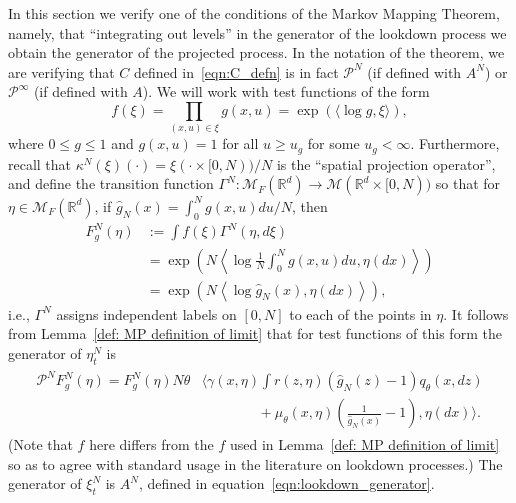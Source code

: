 \documentclass[EJP]{ejpecp} %
\renewcommand{\hat}{\widehat}
\newcommand{\IR}{\mathbb R}
\newcommand{\Pgen}{\mathcal{P}}    %
\newcommand{\lp}{\xi}              %
\newcommand{\measures}{\mathcal{M}_F(\IR^d)} %
\begin{document}
In this section we verify one of the conditions of the Markov Mapping Theorem,
namely, that ``integrating out levels'' in the generator of the lookdown process
we obtain the generator of the projected process.
In the notation of the theorem,
we are verifying that $C$ defined in~\eqref{eqn:C_defn} is in fact $\Pgen^N$
(if defined with $A^N$) or $\Pgen^\infty$ (if defined with $A$).
We will work with test functions of the form
\begin{equation} \label{eqn:f_defn}
    f(\lp) = \prod_{(x, u) \in \lp} g(x, u) = \exp\left(\langle \log g, \lp \rangle \right) ,
\end{equation}
where $0 \le g \le 1$ and $g(x,u) = 1$ for all $u \ge u_g$ for some $u_g < \infty$.
Furthermore, recall that $\kappa^N(\lp)(\cdot) = \lp(\cdot \times [0, N)) / N$
is the ``spatial projection operator'',
and define the transition function $\Gamma^N : \measures \to \mathcal{M}(\IR^d \times [0,N))$
so that for $\eta \in \measures$, if $\hat g_N(x) = \int_0^N g(x, u) du / N$, then
\begin{align*}
    F^N_g(\eta)
    &:=
    \int f(\lp) \Gamma^N(\eta, d\lp) \\
    &=
    \exp\left(
        N \left\langle
            \log \frac{1}{N} \int_0^N g(x, u) du, \eta(dx)
        \right\rangle
    \right) \\
    &=
    \exp\left(
        N \left\langle \log \hat g_N(x), \eta(dx) \right\rangle
    \right) ,
\end{align*}
i.e., $\Gamma^N$ assigns independent labels on $[0, N]$ to each of the points in $\eta$.
It follows from Lemma~\ref{def: MP definition of limit} that for test functions of this form
the generator of $\eta^N_t$ is
\begin{align} \label{eqn:pgen_defn_again}
    \begin{split}
    \Pgen^N F^N_g(\eta)
    =
    F^N_g(\eta)
        N \theta & \bigg\langle
        \gamma(x, \eta) \int r(z, \eta) \left( \hat g_N(z) - 1 \right) q_\theta(x, dz)
    \\ &\qquad \qquad {}
        +
        \mu_\theta(x, \eta) \left( \frac{1}{\hat g_N(x)} - 1 \right)
        ,
        \eta(dx)
    \bigg\rangle .
    \end{split}
\end{align}
(Note that $f$ here differs from the $f$ used in Lemma~\ref{def: MP definition of limit}
so as to agree with standard usage in the literature on lookdown processes.)
The generator of $\lp^N_t$ is $A^N$, defined in equation~\eqref{eqn:lookdown_generator}.
\end{document}
